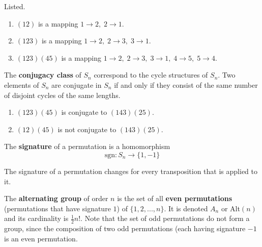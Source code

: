   \begin{example}
    Listed.
    \begin{enumerate}
      \item $(1 2)$ is a mapping $1 \rightarrow 2,\; 2 \rightarrow 1$. 
      \item $(1 2 3)$ is a mapping $1\rightarrow 2,\; 2 \rightarrow 3,\; 3 \rightarrow 1$. 
      \item $(1 2 3) (4 5)$ is a mapping $1\rightarrow 2,\; 2 \rightarrow 3,\; 3 \rightarrow 1, \;4 \rightarrow 5, \;5 \rightarrow 4$. 
    \end{enumerate}
  \end{example}

  \begin{definition}
    The \textbf{conjugacy class} of $S_{n}$ correspond to the cycle structures of $S_{n}$. Two elements of $S_{n}$ are conjugate in $S_{n}$ if and only if they consist of the same number of disjoint cycles of the same lengths. 
  \end{definition}

  \begin{example}
    \begin{enumerate}
      \item $(1 2 3) (4 5)$ is conjugate to $(1 4 3) (2 5)$.
      \item $(1 2) (4 5)$ is not conjugate to $(1 4 3) (2 5)$. 
    \end{enumerate}
  \end{example}

  \begin{definition}
    The \textbf{signature} of a permutation is a homomorphism
    \begin{equation}
      \text{sgn}: S_{n} \longrightarrow \{1, -1\}
    \end{equation}
  \end{definition}

  \begin{proposition}
    The signature of a permutation changes for every transposition that is applied to it. 
  \end{proposition}

  \begin{definition}
    The \textbf{alternating group} of order $n$ is the set of all \textbf{even permutations} (permutations that have signature $1$) of $\{1, 2, ..., n\}$. It is denoted $A_{n}$ or Alt$(n)$ and its cardinality is $\frac{1}{2} n!$. Note that the set of odd permutations do not form a group, since the composition of two odd permutations (each having signature $-1$ is an even permutation. 
  \end{definition}

